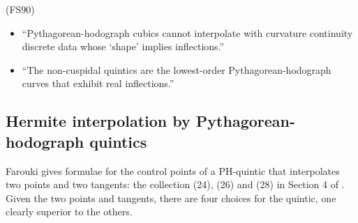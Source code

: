 \begin{prop} 
(FS90)
\\
\begin{itemize}
\item
``Pythagorean-hodograph cubics cannot interpolate with curvature continuity
discrete data whose `shape' implies inflections.''
\item
``The non-cuspidal quintics are the lowest-order Pythagorean-hodograph
curves that exhibit real inflections.''
\end{itemize}
\end{prop}

\subsection{Hermite interpolation by Pythagorean-hodograph quintics}

Farouki gives formulae for the control points of a PH-quintic
that interpolates two points and two tangents:
the collection (24), (26) and (28) in Section 4 of \cite{PHpractical}.
Given the two points and tangents, there are four choices for the
quintic, one clearly superior to the others.





